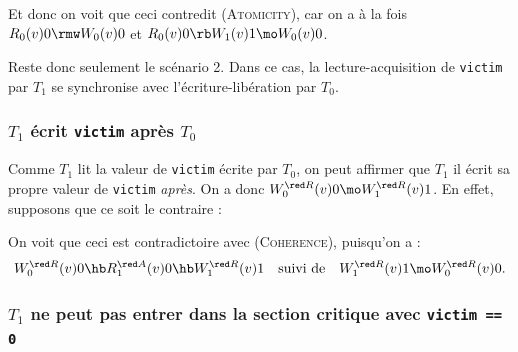 Et donc on voit que ceci contredit (\textsc{Atomicity}), car on a à la fois
$R_0(v)0 \rmw W_0(v)0$ et $R_0(v)0 \rb W_1(v)1 \mo W_0(v)0$.

Reste donc seulement le scénario 2. Dans ce cas, la lecture-acquisition de
\texttt{victim} par $T_1$ se synchronise avec l'écriture-libération par
$T_0$.

\subsubsection{$T_1$ écrit \texttt{victim} après $T_0$}


Comme $T_1$ lit la valeur de \texttt{victim} écrite par $T_0$, on peut affirmer
que $T_1$ il écrit sa propre valeur de \texttt{victim} \emph{après}. On a donc
$W^{\red R}_0(v)0 \mo W^{\red R}_1(v)1$. En effet, supposons que ce soit le
contraire :
\begin{center}
\end{center}
On voit que ceci est contradictoire avec (\textsc{Coherence}), puisqu'on a :
\[
  W^{\red R}_0(v)0 \hb R^{\red A}_1(v)0 \hb W^{\red R}_1(v)1 \quad \text{suivi de} \quad W^{\red R}_1(v)1  \mo W^{\red R}_0(v)0.
\]

\subsubsection{$T_1$ ne peut pas entrer dans la section critique avec \texttt{victim == 0}}

